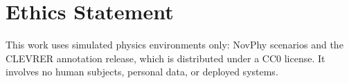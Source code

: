 \section{Ethics Statement}
This work uses simulated physics environments only: NovPhy scenarios and the CLEVRER annotation release, which is distributed under a CC0 license. It involves no human subjects, personal data, or deployed systems.



